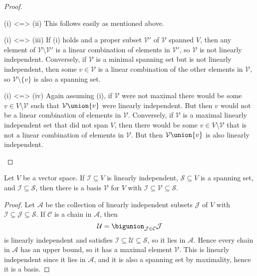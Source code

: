 \documentclass[a4paper, 11pt]{memoir}
\numberwithin{equation}{chapter}
\newcommand{\calV}{\mathcal{V}}
\newcommand{\calU}{\mathcal{U}}
\newcommand{\calI}{\mathcal{I}}
\newcommand{\calJ}{\mathcal{J}}
\newcommand{\calS}{\mathcal{S}}
\newcommand{\calA}{\mathcal{A}}
\newcommand{\calC}{\mathcal{C}}
\begin{document}
\begin{proof}
\begin{proofsec*}
    \item[(i) <=> (ii)]
    This follows easily as mentioned above.

    \item[(i) <=> (iii)]
    If (i) holds and a proper subset $\calV'$ of $\calV$ spanned $V$, then any element of $\calV \setminus \calV'$ is a linear combination of elements in $\calV'$, so $\calV$ is not linearly independent. Conversely, if $\calV$ is a minimal spanning set but is not linearly independent, then some $v \in \calV$ is a linear combination of the other elements in $\calV$, so $\calV \setminus \{v\}$ is also a spanning set.

    \item[(i) <=> (iv)]
    Again assuming (i), if $\calV$ were not maximal there would be some $v \in V \setminus \calV$ such that $\calV \union \{v\}$ were linearly independent. But then $v$ would not be a linear combination of elements in $\calV$. Conversely, if $\calV$ is a maximal linearly independent set that did not span $V$, then there would be some $v \in V \setminus \calV$ that is not a linear combination of elements in $\calV$. But then $\calV \union \{v\}$ is also linearly independent.
\end{proofsec*}
\end{proof}


\begin{proposition}
    \label{prop:basis-existence}
    Let $V$ be a vector space. If $\calI \subseteq V$ is linearly independent, $\calS \subseteq V$ is a spanning set, and $\calI \subseteq \calS$, then there is a basis $\calV$ for $V$ with $\calI \subseteq \calV \subseteq \calS$.
\end{proposition}

\begin{proof}
    Let $\calA$ be the collection of linearly independent subsets $\calJ$ of $V$ with $\calI \subseteq \calJ \subseteq \calS$. If $\calC$ is a chain in $\calA$, then
    \begin{equation*}
        \calU
            = \bigunion_{\calJ \in \calC} \calJ
    \end{equation*}
    is linearly independent and satisfies $\calI \subseteq \calU \subseteq \calS$, so it lies in $\calA$. Hence every chain in $\calA$ has an upper bound, so it has a maximal element $\calV$. This is linearly independent since it lies in $\calA$, and it is also a spanning set by maximality, hence it is a basis.
\end{proof}
\end{document}
